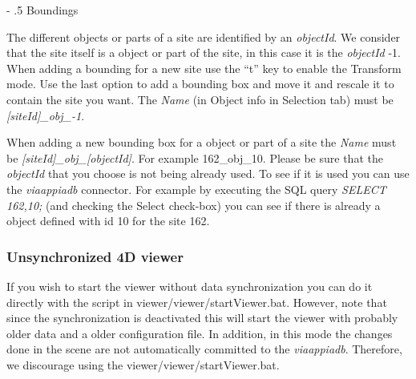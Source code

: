 \documentclass[a4paper,11pt]{article}
\makeatletter
\renewcommand\paragraph{%
   \@startsection{paragraph}{4}{0mm}%
      {-\baselineskip}%
      {.5\baselineskip}%
      {\normalfont\normalsize\bfseries}}
\makeatother
\begin{document}
\paragraph{Boundings}

The different objects or parts of a site are identified by an \textit{objectId}. We consider that the site itself is a object or part of the site, in this case it is the \textit{objectId} -1. 
When adding a bounding for a new site use the ``t'' key to enable the Transform mode. Use the last option to add a bounding box and move it and rescale it to contain the site you want. The \textit{Name} (in Object info in Selection tab) must be \textit{[siteId]\_obj\_-1}.

When adding a new bounding box for a object or part of a site the \textit{Name} must be \textit{[siteId]\_obj\_[objectId]}. For example 162\_obj\_10. Please be sure that the \textit{objectId} that you choose is not being already used. To see if it is used you can use the \textit{viaappiadb} connector. For example by executing the SQL query \textit{SELECT 162,10;} (and checking the Select check-box) you can see if there is already a object defined with id 10 for the site 162. 

\subsubsection{Unsynchronized 4D viewer}

If you wish to start the viewer without data synchronization you can do it directly with the script in viewer/viewer/startViewer.bat. However, note that since the synchronization is deactivated this will start the viewer with probably older data and a older configuration file. In addition, in this mode the changes done in the scene are not automatically committed to the \textit{viaappiadb}. Therefore, we discourage using the viewer/viewer/startViewer.bat.





\end{document}
